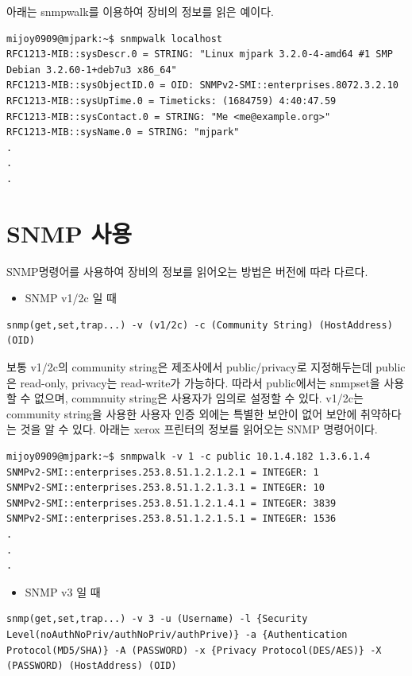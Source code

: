 \documentclass[11pt
  , a4paper
  , article
  , oneside
]{memoir}
\begin{document}
아래는 snmpwalk를 이용하여 장비의 정보를 읽은 예이다.

\begin{lstlisting}[style=termstyle]
mijoy0909@mjpark:~$ snmpwalk localhost
RFC1213-MIB::sysDescr.0 = STRING: "Linux mjpark 3.2.0-4-amd64 #1 SMP Debian 3.2.60-1+deb7u3 x86_64"
RFC1213-MIB::sysObjectID.0 = OID: SNMPv2-SMI::enterprises.8072.3.2.10
RFC1213-MIB::sysUpTime.0 = Timeticks: (1684759) 4:40:47.59
RFC1213-MIB::sysContact.0 = STRING: "Me <me@example.org>"
RFC1213-MIB::sysName.0 = STRING: "mjpark"
.
.
.
\end{lstlisting}

\section{SNMP 사용}
SNMP명령어를 사용하여 장비의 정보를 읽어오는 방법은 버전에 따라 다르다.

\begin{itemize}
\item SNMP v1/2c 일 때
\end{itemize}

\begin{lstlisting}[style=termstyle]
snmp(get,set,trap...) -v (v1/2c) -c (Community String) (HostAddress) (OID) 
\end{lstlisting}

보통 v1/2c의 community string은 제조사에서 public/privacy로 지정해두는데 public은 read-only, privacy는 read-write가 가능하다. 따라서 public에서는 snmpset을 사용할 수 없으며, commnuity string은 사용자가 임의로 설정할 수 있다. v1/2c는 community string을 사용한 사용자 인증 외에는 특별한 보안이 없어 보안에 취약하다는 것을 알 수 있다. 아래는 xerox 프린터의 정보를 읽어오는 SNMP 명령어이다. 

\begin{lstlisting}[style=termstyle]
mijoy0909@mjpark:~$ snmpwalk -v 1 -c public 10.1.4.182 1.3.6.1.4
SNMPv2-SMI::enterprises.253.8.51.1.2.1.2.1 = INTEGER: 1
SNMPv2-SMI::enterprises.253.8.51.1.2.1.3.1 = INTEGER: 10
SNMPv2-SMI::enterprises.253.8.51.1.2.1.4.1 = INTEGER: 3839
SNMPv2-SMI::enterprises.253.8.51.1.2.1.5.1 = INTEGER: 1536
.
.
.
\end{lstlisting}

\begin{itemize}
\item SNMP v3 일 때
\end{itemize}

\begin{lstlisting}[style=termstyle]
snmp(get,set,trap...) -v 3 -u (Username) -l {Security Level(noAuthNoPriv/authNoPriv/authPrive)} -a {Authentication Protocol(MD5/SHA)} -A (PASSWORD) -x {Privacy Protocol(DES/AES)} -X (PASSWORD) (HostAddress) (OID) 
\end{lstlisting}
\end{document}
